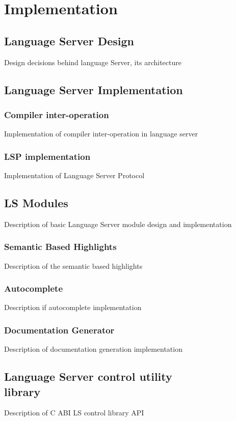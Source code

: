 \chapter{Implementation}
\label{chap:impl}

\section{Language Server Design}
\label{sec:impl:ls_design}
Design decisions behind language Server, its architecture

\section{Language Server Implementation}
\label{sec:impl:ls_impl}

\subsection{Compiler inter-operation}
\label{sec:impl:ls_compiler_interop}
Implementation of compiler inter-operation in language server

\subsection{LSP implementation}
Implementation of Language Server Protocol

\section{LS Modules}
\label{sec:impl:ls_mod}
Description of basic Language Server module design and implementation

\subsection{Semantic Based Highlights}
\label{sec:impl:ls_mod:semhighlight}
Description of the semantic based highlights

\subsection{Autocomplete}
\label{sec:impl:ls_mod:autocomplete}
Description if autocomplete implementation

\subsection{Documentation Generator}
\label{sec:impl:ls_mod:docgen}
Description of documentation generation implementation

\section{Language Server control utility\\ library}
\label{sec:impl:ls_control_api}
Description of C ABI LS control library API

